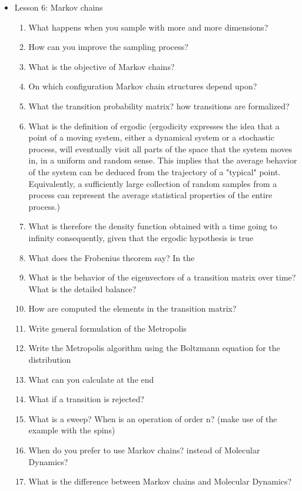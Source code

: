 {\begin{itemize}
\begin{enumerate}
    \end{enumerate}
    \item Lesson 6: Markov chains
    \begin{enumerate}
        \item What happens when you sample with more and more dimensions?
  	\item How can you improve the sampling process?
        \item What is the objective of Markov chains?
        \item On which configuration Markov chain structures depend upon?
        \item What the transition probability matrix? how transitions are formalized?
        \item What is the definition of ergodic (ergodicity expresses the idea that a point of a moving system, either a dynamical system or a stochastic process, will eventually visit all parts of the space that the system moves in, in a uniform and random sense. This implies that the average behavior of the system can be deduced from the trajectory of a "typical" point. Equivalently, a sufficiently large collection of random samples from a process can represent the average statistical properties of the entire process.)
        \item What is therefore the density function obtained with a time going to infinity consequently, given that the ergodic hypothesis is true
        \item What does the Frobenius theorem say? In the 
        \item What is the behavior of the eigenvectors of a transition matrix over time? What is the detailed balance?
        \item How are computed the elements in the transition matrix?
        \item Write general formulation of the Metropolis
        \item Write the Metropolis algorithm using the Boltzmann equation for the distribution
        \item What can you calculate at the end
        \item What if a transition is rejected? 
        \item What is a sweep? When is an operation of order n? (make use of the example with the spins)
        \item When do you prefer to use Markov chains? instead of Molecular Dynamics?
        \item What is the difference between Markov chains and Molecular Dynamics?

\end{enumerate}
\end{itemize}}
